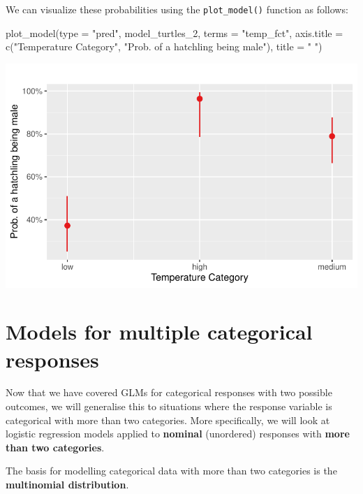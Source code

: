 \documentclass[
  letterpaper,
  DIV=11,
  numbers=noendperiod]{scrartcl}
\newenvironment{Shaded}{\begin{snugshade}}{\end{snugshade}}
\newcommand{\AttributeTok}[1]{\textcolor[rgb]{0.40,0.45,0.13}{#1}}
\newcommand{\FunctionTok}[1]{\textcolor[rgb]{0.28,0.35,0.67}{#1}}
\newcommand{\NormalTok}[1]{\textcolor[rgb]{0.00,0.23,0.31}{#1}}
\newcommand{\StringTok}[1]{\textcolor[rgb]{0.13,0.47,0.30}{#1}}
\begin{document}
We can visualize these probabilities using the \texttt{plot\_model()}
function as follows:

\begin{Shaded}
\begin{Highlighting}[]
\FunctionTok{plot\_model}\NormalTok{(}\AttributeTok{type =} \StringTok{"pred"}\NormalTok{,}
\NormalTok{           model\_turtles\_2,}
           \AttributeTok{terms =} \StringTok{"temp\_fct"}\NormalTok{,}
           \AttributeTok{axis.title =} \FunctionTok{c}\NormalTok{(}\StringTok{"Temperature Category"}\NormalTok{,}
                          \StringTok{"Prob. of a hatchling being male"}\NormalTok{),}
           \AttributeTok{title =} \StringTok{" "}\NormalTok{)}
\end{Highlighting}
\end{Shaded}

\includegraphics{index_files/figure-pdf/unnamed-chunk-21-1.pdf}

\section{Models for multiple categorical
responses}\label{models-for-multiple-categorical-responses}

Now that we have covered GLMs for categorical responses with two
possible outcomes, we will generalise this to situations where the
response variable is categorical with more than two categories. More
specifically, we will look at logistic regression models applied to
\textbf{nominal} (unordered) responses with \textbf{more than two
categories}.

The basis for modelling categorical data with more than two categories
is the \textbf{multinomial distribution}.
\end{document}
